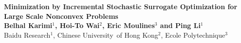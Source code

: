 \documentclass[final]{beamer}
\begin{document}

\begin{minipage}[b]{0.9\linewidth}
\Huge  \textbf{Minimization by Incremental Stochastic Surrogate Optimization for Large Scale Nonconvex Problems
}\\[1cm]  
\LARGE \textbf{Belhal Karimi$^{1}$, Hoi-To Wai$^{2}$, Eric Moulines$^{3}$ and Ping Li$^{1}$}\\[0.5cm] %
\LARGE Baidu Research$^1$, Chinese University~of Hong Kong$^2$, Ecole Polytechnique$^3$ \\[0.4cm] %
\large \texttt{}
\end{minipage}
%


\vspace{1cm} %








\end{document}
